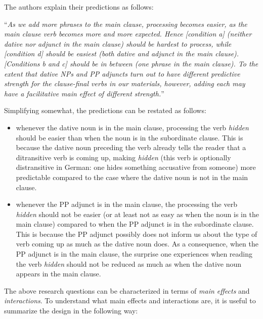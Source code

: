\documentclass[
  12pt,
]{krantz}
\providecommand{\tightlist}{%
  \setlength{\itemsep}{0pt}\setlength{\parskip}{0pt}}
\theoremstyle{definition}
\theoremstyle{definition}
\theoremstyle{definition}
\theoremstyle{definition}
\theoremstyle{remark}
\begin{document}
The authors explain their predictions as follows:

``\emph{As we add more phrases to the main clause, processing becomes easier, as the main clause verb becomes more and more expected. Hence {[}condition a{]} (neither dative nor adjunct in the main clause) should be hardest to process, while {[}condition d{]} should be easiest (both dative and adjunct in the main clause). {[}Conditions b and c{]} should be in between (one phrase in the main clause). To the extent that dative NPs and PP adjuncts turn out to have different predictive strength for the clause-final verbs in our materials, however, adding each may have a facilitative main effect of different strength.}''

Simplifying somewhat, the predictions can be restated as follows:

\begin{itemize}
\tightlist
\item
  whenever the dative noun is in the main clause, processing the verb \emph{hidden} should be easier than when the noun is in the subordinate clause. This is because the dative noun preceding the verb already tells the reader that a ditransitive verb is coming up, making \emph{hidden} (this verb is optionally distransitive in German: one hides something accusative from someone) more predictable compared to the case where the dative noun is not in the main clause.
\item
  whenever the PP adjunct is in the main clause, the processing the verb \emph{hidden} should not be easier (or at least not as easy as when the noun is in the main clause) compared to when the PP adjunct is in the subordinate clause. This is because the PP adjunct possibly does not inform us about the type of verb coming up as much as the dative noun does. As a consequence, when the PP adjunct is in the main clause, the surprise one experiences when reading the verb \emph{hidden} should not be reduced as much as when the dative noun appears in the main clause.
\end{itemize}

The above research questions can be characterized in terms of \emph{main effects} and \emph{interactions}. To understand what main effects and interactions are, it is useful to summarize the design in the following way:
\end{document}

